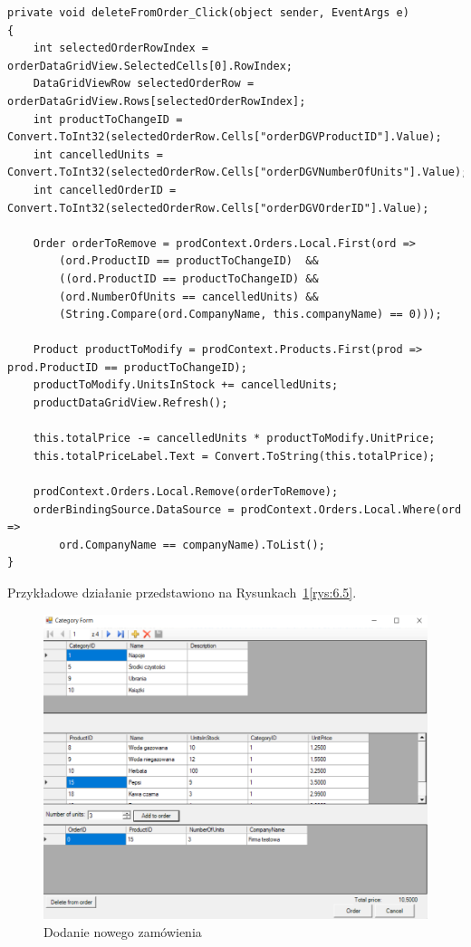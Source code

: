 \documentclass[12pt, a4paper]{mwart}
\begin{document}
\begin{lstlisting}
private void deleteFromOrder_Click(object sender, EventArgs e)
{
    int selectedOrderRowIndex = orderDataGridView.SelectedCells[0].RowIndex;
    DataGridViewRow selectedOrderRow = orderDataGridView.Rows[selectedOrderRowIndex];
    int productToChangeID = Convert.ToInt32(selectedOrderRow.Cells["orderDGVProductID"].Value);
    int cancelledUnits = Convert.ToInt32(selectedOrderRow.Cells["orderDGVNumberOfUnits"].Value);
    int cancelledOrderID = Convert.ToInt32(selectedOrderRow.Cells["orderDGVOrderID"].Value);

    Order orderToRemove = prodContext.Orders.Local.First(ord => 
    	(ord.ProductID == productToChangeID)  &&
    	((ord.ProductID == productToChangeID) &&
    	(ord.NumberOfUnits == cancelledUnits) &&
    	(String.Compare(ord.CompanyName, this.companyName) == 0)));
            
    Product productToModify = prodContext.Products.First(prod => prod.ProductID == productToChangeID);
    productToModify.UnitsInStock += cancelledUnits;
    productDataGridView.Refresh();

    this.totalPrice -= cancelledUnits * productToModify.UnitPrice;
    this.totalPriceLabel.Text = Convert.ToString(this.totalPrice);

    prodContext.Orders.Local.Remove(orderToRemove);
    orderBindingSource.DataSource = prodContext.Orders.Local.Where(ord => 
		ord.CompanyName == companyName).ToList();
}
\end{lstlisting}

Przykładowe działanie przedstawiono na Rysunkach~\ref{rys:6.3}\dywiz{}\ref{rys:6.5}.

\begin{figure}[ht]
  \centering
  \includegraphics[scale=0.5]{VI/6-3.png}
  \caption{Dodanie nowego zamówienia}
  \label{rys:6.3}
\end{figure}
\end{document}
